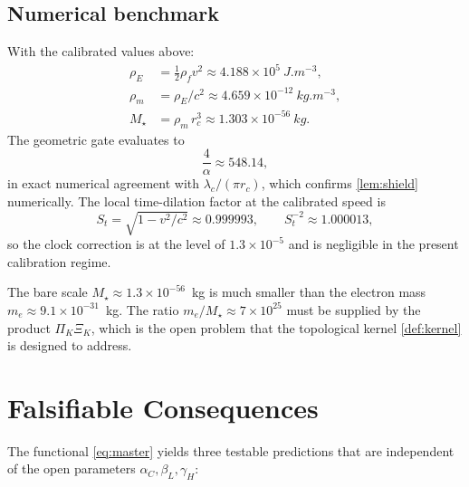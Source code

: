 \documentclass[11pt, a4paper]{article}
\newcommand{\vv}{v}          %
\newcommand{\rc}{r_c}        %
\newcommand{\rhof}{\rho_f}   %
\newcommand{\rhoE}{\rho_E}   %
\newcommand{\rhom}{\rho_m}   %
\newcommand{\lc}{\lambda_c}  %
\newcommand{\Stv}{S_t}       %
\begin{document}
\subsection{Numerical benchmark}
\label{sec:numerical}

With the calibrated values above:
\begin{align}
  \rhoE &= \tfrac{1}{2}\rhof\vv^2
          \approx 4.188\times10^{5}~\si{J.m^{-3}}, \\
  \rhom &= \rhoE/c^2
          \approx 4.659\times10^{-12}~\si{kg.m^{-3}}, \\
  M_\star &= \rhom\,\rc^3
           \approx 1.303\times10^{-56}~\si{kg}.
\end{align}
The geometric gate evaluates to
\begin{equation}
  \frac{4}{\alpha} \approx 548.14,
\end{equation}
in exact numerical agreement with $\lc/(\pi\rc)$, which
confirms \cref{lem:shield} numerically.
The local time-dilation factor at the calibrated speed is
\begin{equation}
  \Stv = \sqrt{1 - \vv^2/c^2} \approx 0.999993,
  \qquad
  \Stv^{-2} \approx 1.000013,
\end{equation}
so the clock correction is at the level of $1.3\times10^{-5}$
and is negligible in the present calibration regime.

The bare scale $M_\star \approx 1.3\times10^{-56}$~\si{kg}
is much smaller than the electron mass
$m_e \approx 9.1\times10^{-31}$~\si{kg}.
The ratio $m_e/M_\star \approx 7\times10^{25}$ must be supplied
by the product $\Pi_K \Xi_K$, which is the open problem that
the topological kernel \cref{def:kernel} is designed to address.

\section{Falsifiable Consequences}
\label{sec:falsifiers}

The functional \cref{eq:master} yields three testable predictions
that are independent of the open parameters
$\alpha_C, \beta_L, \gamma_H$:
\end{document}
